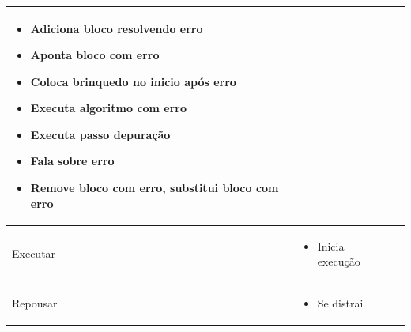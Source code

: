 \begin{quadro}[!h]
\begin{table_env}
\begin{tabular}{@{}l m{} c@{}}
        \begin{itemize}
            \item Adiciona bloco resolvendo erro
            \item Aponta bloco com erro
            \item Coloca brinquedo no inicio após erro
            \item Executa algoritmo com erro
            \item Executa passo depuração
            \item Fala sobre erro
            \item Remove bloco com erro, substitui bloco com erro
        \end{itemize} 
        \\ \hline
        
        Executar &

        \begin{itemize}
            \item Inicia execução
        \end{itemize} 
        
        \\ \hline
        Repousar & 
        \begin{itemize}
            \item Se distrai
        \end{itemize} 

        \\ \bottomrule
        \end{tabular}
    \end{table_env}
    \sourceauthor
 \end{quadro}

